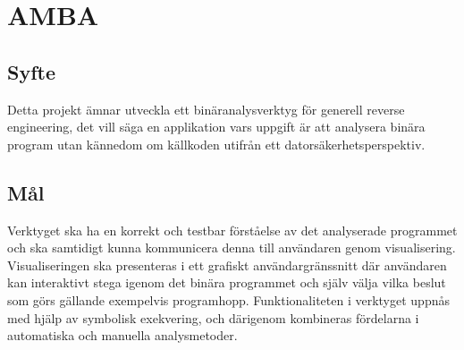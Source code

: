 \chapter{AMBA}

\section{Syfte}
Detta projekt ämnar utveckla ett binäranalysverktyg för generell reverse
engineering, det vill säga en applikation vars uppgift är att analysera binära
program utan kännedom om källkoden utifrån ett datorsäkerhetsperspektiv.

\section{Mål}
Verktyget ska ha en korrekt och testbar förståelse av det analyserade programmet
och ska samtidigt kunna kommunicera denna till användaren genom visualisering.
Visualiseringen ska presenteras i ett grafiskt användargränssnitt där användaren
kan interaktivt stega igenom det binära programmet och själv välja vilka beslut
som görs gällande exempelvis programhopp. Funktionaliteten i verktyget uppnås
med hjälp av symbolisk exekvering, och därigenom kombineras fördelarna i
automatiska och manuella analysmetoder.

